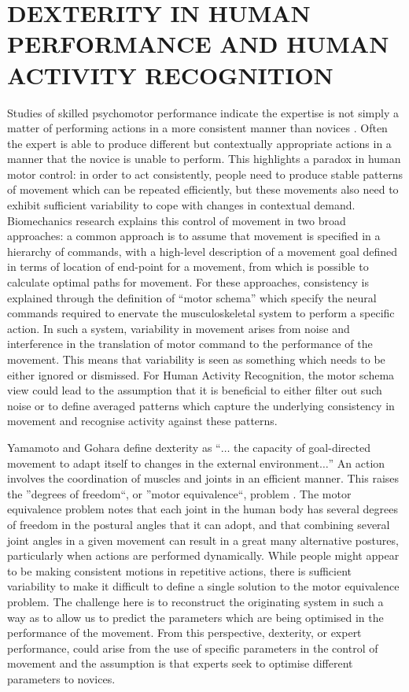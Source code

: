 \documentclass{sigchi}
\begin{document}
\section{DEXTERITY IN HUMAN PERFORMANCE AND HUMAN ACTIVITY RECOGNITION}
Studies of skilled psychomotor performance indicate the expertise is not simply a matter of performing actions 
in a more consistent manner than novices \cite{Kelso2014}. Often the expert is able to produce different but 
contextually appropriate actions in a manner that the novice is unable to perform. This highlights a paradox 
in human motor control: in order to act consistently, people need to produce stable patterns of movement 
which can be repeated efficiently, but these movements also need to exhibit sufficient variability to cope 
with changes in contextual demand. Biomechanics research explains this control of movement in two broad 
approaches: a common approach is to assume that movement is specified in a hierarchy of commands, 
with a high-level description of a movement goal defined in terms of location of end-point for a movement, 
from which is possible to calculate optimal paths for movement. For these approaches, consistency is 
explained through the definition of ``motor schema'' which specify the neural commands required to enervate 
the musculoskeletal system to perform a specific action. In such a system, variability in movement arises 
from noise and interference in the translation of motor command to the performance of the movement. 
This means that variability is seen as something which needs to be either ignored or dismissed. 
For Human Activity Recognition, the motor schema view could lead to the assumption that it is beneficial 
to either filter out such noise or to define averaged patterns which capture the underlying consistency 
in movement and recognise activity against these patterns. 

Yamamoto and Gohara \cite{Yamamoto2000} define dexterity as ``$\ldots$ the capacity of goal-directed movement 
to adapt itself to changes in the external environment$\ldots$''  An action involves the coordination of muscles and 
joints in an efficient manner. This raises the ''degrees of freedom``, or ''motor equivalence``, 
problem \cite{Bernstein1967}. 
The motor equivalence problem notes that each joint in the human body has several degrees of freedom in 
the postural angles that it can adopt, and that combining several joint angles in a given movement can 
result in a great many alternative postures, particularly when actions are performed dynamically. 
While people might appear to be making consistent motions in repetitive actions, there is sufficient 
variability to make it difficult to define a single solution to the motor equivalence problem. 
The challenge here is to reconstruct the originating system in such a way as to allow us to predict 
the parameters which are being optimised in the performance of the movement. From this perspective, dexterity, 
or expert performance, could arise from the use of specific parameters in the control of movement and 
the assumption is that experts seek to optimise different parameters to novices. 
 
\end{document}

